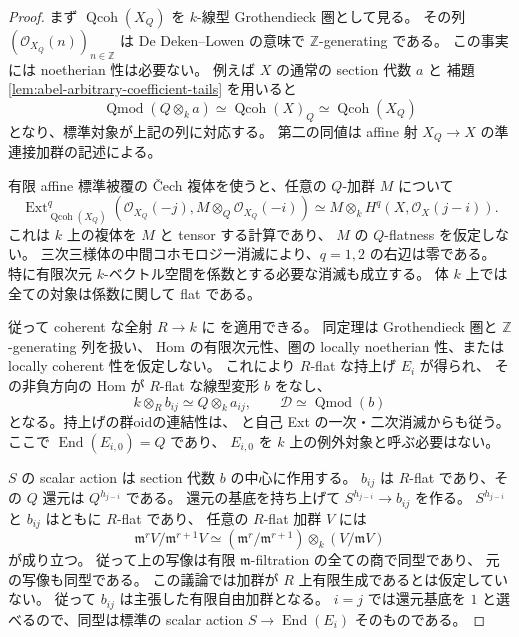 \begin{proof}
まず $\operatorname{Qcoh}(X_Q)$ を $k$-線型 Grothendieck 圏として見る。
その列 $(\mathcal O_{X_Q}(n))_{n\in\mathbb Z}$ は
De Deken--Lowen の意味で $\mathbb Z$-generating である。
この事実には noetherian 性は必要ない。
例えば $X$ の通常の section 代数 $a$ と
補題\ref{lem:abel-arbitrary-coefficient-tails} を用いると
\[
 \operatorname{Qmod}(Q\otimes_ka)
 \simeq\operatorname{Qcoh}(X)_Q
 \simeq\operatorname{Qcoh}(X_Q)
\]
となり、標準対象が上記の列に対応する。
第二の同値は affine 射 $X_Q\to X$ の準連接加群の記述による。

有限 affine 標準被覆の \v Cech 複体を使うと、任意の $Q$-加群 $M$ について
\begin{equation}\label{eq:abel-flat-cover-special-ext}
 \operatorname{Ext}^q_{\operatorname{Qcoh}(X_Q)}
 (\mathcal O_{X_Q}(-j),M\otimes_Q\mathcal O_{X_Q}(-i))
 \simeq M\otimes_kH^q(X,\mathcal O_X(j-i)).
\end{equation}
これは $k$ 上の複体を $M$ と tensor する計算であり、
$M$ の $Q$-flatness を仮定しない。
三次三様体の中間コホモロジー消滅により、$q=1,2$ の右辺は零である。
特に有限次元 $k$-ベクトル空間を係数とする必要な消滅も成立する。
体 $k$ 上では全ての対象は係数に関して flat である。

従って coherent な全射 $R\to k$ に
\cite[Theorem~4.5, pp.~495--496]{DeDekenLowen} を適用できる。
同定理は Grothendieck 圏と $\mathbb Z$-generating 列を扱い、
Hom の有限次元性、圏の locally noetherian 性、または locally coherent 性を仮定しない。
これにより $R$-flat な持上げ $E_i$ が得られ、
その非負方向の Hom が $R$-flat な線型変形 $b$ をなし、
\[
 k\otimes_R b_{ij}\simeq Q\otimes_k a_{ij},\qquad
 \mathcal D\simeq\operatorname{Qmod}(b)
\]
となる。持上げの群oidの連結性は、
\cite[Theorems~6.11--6.12 の双対版]{LowenObstruction}
と自己 Ext の一次・二次消滅からも従う。
ここで $\operatorname{End}(E_{i,0})=Q$ であり、
$E_{i,0}$ を $k$ 上の例外対象と呼ぶ必要はない。

$S$ の scalar action は section 代数 $b$ の中心に作用する。
$b_{ij}$ は $R$-flat であり、その $Q$ 還元は $Q^{h_{j-i}}$ である。
還元の基底を持ち上げて $S^{h_{j-i}}\to b_{ij}$ を作る。
$S^{h_{j-i}}$ と $b_{ij}$ はともに $R$-flat であり、
任意の $R$-flat 加群 $V$ には
\[
 \mathfrak m^rV/\mathfrak m^{r+1}V
 \simeq(\mathfrak m^r/\mathfrak m^{r+1})
       \otimes_k(V/\mathfrak mV)
\]
が成り立つ。
従って上の写像は有限 $\mathfrak m$-filtration の全ての商で同型であり、
元の写像も同型である。
この議論では加群が $R$ 上有限生成であるとは仮定していない。
従って $b_{ij}$ は主張した有限自由加群となる。
$i=j$ では還元基底を $1$ と選べるので、同型は標準の scalar action
$S\to\operatorname{End}(E_i)$ そのものである。


\end{proof}
